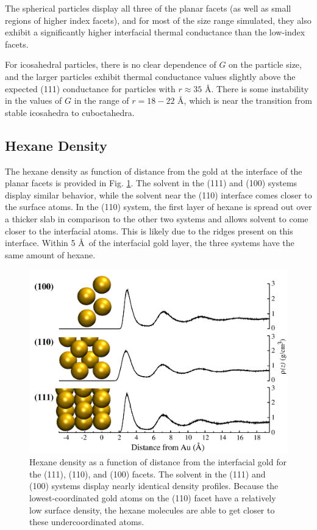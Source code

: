 The spherical particles display all three of the planar facets (as
well as small regions of higher index facets), and for most of the
size range simulated, they also exhibit a significantly higher
interfacial thermal conductance than the low-index facets.

For icosahedral particles, there is no clear dependence of $G$ on the
particle size, and the larger particles exhibit thermal conductance
values slightly above the expected (111) conductance for particles
with $r \approx 35$ \AA. There is some instability in the values of
$G$ in the range of $r = 18-22$ \AA, which is near the 
transition from stable icosahedra to
cuboctahedra.\cite{Myshlyavtsev2013}

\subsection{Hexane Density}
The hexane density as function of distance from the gold at the
interface of the planar facets is provided in Fig. \ref{fig:dens}. The
solvent in the (111) and (100) systems display similar behavior, while
the solvent near the (110) interface comes closer to the surface
atoms.  In the (110) system, the first layer of hexane is spread out
over a thicker slab in comparison to the other two systems and allows
solvent to come closer to the interfacial atoms.  This is likely due
to the ridges present on this interface.  Within 5 \AA\ of the
interfacial gold layer, the three systems have the same amount of
hexane.

\begin{figure}
        \includegraphics[width=\linewidth]{figures/stacked-hex-facets.pdf}
        \caption{Hexane density as a function of distance from the
          interfacial gold for the (111), (110), and (100) facets. The
          solvent in the (111) and (100) systems display nearly
          identical density profiles. Because the lowest-coordinated
          gold atoms on the (110) facet have a relatively low surface
          density, the hexane molecules are able to get closer to
          these undercoordinated atoms.}
        \label{fig:dens}
\end{figure}

